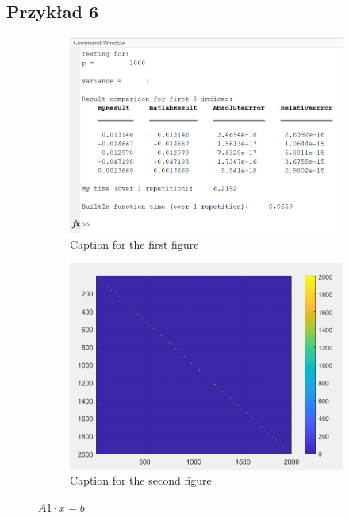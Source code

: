 \documentclass{article}
\begin{document}
    \newpage
    \subsection*{Przykład 6}
    \vspace{12pt}
    \begin{figure}[hbt!]
        \centering

        \begin{subfigure}{0.45\linewidth}
            \includegraphics[width=\linewidth]{img/fig6.png}
            \caption{Caption for the first figure}
        \end{subfigure}
        \hfill
        \begin{subfigure}{0.45\linewidth}
            \includegraphics[width=\linewidth]{img/mat6.png}
            \caption{Caption for the second figure}
        \end{subfigure}

        \caption{$A1 \cdot x = b$}
        \label{fig:example6}
    \end{figure}
    
\end{document}

